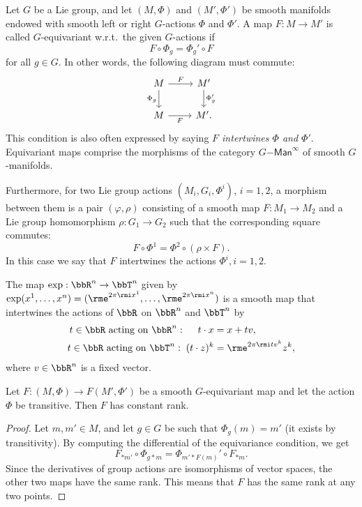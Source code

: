 \begin{defn}
    Let $G$ be a Lie group, and let $(M,\Phi)$ and $(M',\Phi')$ be smooth manifolds endowed with smooth left or right $G$-actions $\Phi$ and $\Phi'$. A map $F:M\to M'$ is called $G$-equivariant w.r.t.\ the given $G$-actions if
    \[F\circ \Phi_g=\Phi_g' \circ F\]
    for all $g\in G$.
    In other words, the following diagram must commute:
    \[
    \begin{tikzcd}[every matrix/.append style={name=m}]
       M \arrow[r,"F"]\arrow[d,"\Phi_g",swap] & M'\arrow[d,"\Phi_g'"]\\
       M \arrow[r,"F", swap] & M'.
    \end{tikzcd}
    \]
    This condition is also often expressed by saying \emph{$F$ intertwines $\Phi$ and $\Phi'$}. Equivariant maps comprise the morphisms of the category $G\mathsf{-Man}^\infty$ of smooth $G$-manifolds.

    Furthermore, for two Lie group actions $(M_i,G_i,\Phi^i)$, $i=1,2$, a morphism between them is a pair $(\varphi,\rho)$ consisting of a smooth map $F:M_1\to M_2$ and a Lie group homomorphism $\rho:G_1\to G_2$ such that the corresponding square commutes:
    \[F\circ \Phi^1=\Phi^2\circ \left(\rho\times F \right).\]
    In this case we say that $F$ intertwines the actions $\Phi^i,i=1,2$.
\end{defn}

\begin{example}
    The map $\exp:\bbR^n\to \bbT^n$ given by $\exp(x^1,\ldots,x^n)=(\rme^{2\pi\rmi x^1},\ldots,\rme^{2\pi\rmi x^n})$ is a smooth map that intertwines the actions of $\bbR$ on $\bbR^n$ and $\bbT^n$ by
    \begin{align}
        t\in\bbR\text{ acting on }\bbR^n:\;\quad t\cdot x&=x+tv,\\
        t\in\bbR\text{ acting on }\bbT^n:\; (t\cdot z)^k&=\rme^{2\pi\rmi tv^k}z^k,
    \end{align}
    where $v\in\bbR^n$ is a fixed vector.
\end{example}

\begin{thm}\label{thm equivariant rank}
    Let $F:(M,\Phi)\to F(M',\Phi')$ be a smooth $G$-equivariant map and let the action $\Phi$ be transitive. Then $F$ has constant rank.
\end{thm}
\begin{proof}
    Let $m,m'\in M$, and let $g\in G$ be such that $\Phi_g(m)=m'$ (it exists by transitivity). By computing the differential of the equivariance condition, we get
    \[F_{\ast m'}\circ \Phi_{g\ast m}=\Phi_{m'\ast F(m)}'\circ F_{\ast m}.\]
    Since the derivatives of group actions are isomorphisms of vector spaces, the other two maps have the same rank. This means that $F$ has the same rank at any two points.
\end{proof}


